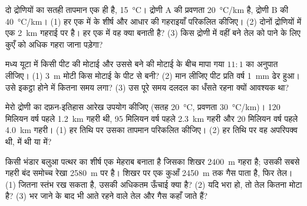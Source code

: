 \begin{exercise}[$\star\star$]\label{exo:g11:fossil-fuel-geology:6}
दो द्रोणियों का सतही तापमान एक ही है, \qty{15}{\degreeCelsius}।
द्रोणी A की प्रवणता \qty{20}{\degreeCelsius/km} है, द्रोणी B की
\qty{40}{\degreeCelsius/km}। (1) हर एक में  के शीर्ष और आधार की
गहराइयाँ परिकलित कीजिए। (2) दोनों द्रोणियों में एक  \qty{2}{km} गहराई पर
है। हर एक में वह क्या बनाती है? (3) किस द्रोणी में वहीं बने तेल को पाने के लिए
कुएँ को अधिक गहरा जाना पड़ेगा?
\end{exercise}

\begin{exercise}[$\star\star$]\label{exo:g11:fossil-fuel-geology:7}
मध्य यूटा में किसी पीट की मोटाई और उससे बने  की मोटाई के बीच
मापा गया $11{:}1$ का अनुपात लीजिए। (1) \qty{3}{m} मोटी  किस मोटाई के पीट
से बनी? (2) मान लीजिए पीट प्रति वर्ष \qty{1}{mm} ढेर हुआ।
उसे इकट्ठा होने में कितना समय लगा? (3) उस पूरे समय दलदल का धँसते रहना
क्यों आवश्यक था?
\end{exercise}

\begin{exercise}[$\star\star$]\label{exo:g11:fossil-fuel-geology:8}
मेरो द्रोणी का दफ़न-इतिहास आरेख उपयोग कीजिए (सतह
\qty{20}{\degreeCelsius}, प्रवणता \qty{30}{\degreeCelsius/km})।  120 मिलियन वर्ष पहले \qty{1.2}{km} गहरी थी, 95
मिलियन वर्ष पहले \qty{2.3}{km} गहरी और 20 मिलियन वर्ष पहले \qty{4.0}{km} गहरी। (1)
हर तिथि पर उसका तापमान परिकलित कीजिए। (2) हर तिथि पर वह अपरिपक्व थी, 
में थी या  में?
\end{exercise}

\begin{exercise}[$\star\star$]\label{exo:g11:fossil-fuel-geology:9}
किसी भंडार बलुआ पत्थर का शीर्ष एक मेहराब बनाता है जिसका शिखर \qty{2400}{m}
गहरा है; उसकी सबसे गहरी बंद समोच्च रेखा \qty{2580}{m} पर है। शिखर पर एक कुआँ
\qty{2450}{m} तक गैस पाता है, फिर तेल। (1)  जितना स्तंभ रख सकता है,
उसकी अधिकतम ऊँचाई क्या है? (2) यदि  भरा हो, तो तेल कितना मोटा है?
(3)  भर जाने के बाद भी आते रहने वाले तेल और गैस कहाँ
जाते हैं?
\end{exercise}

